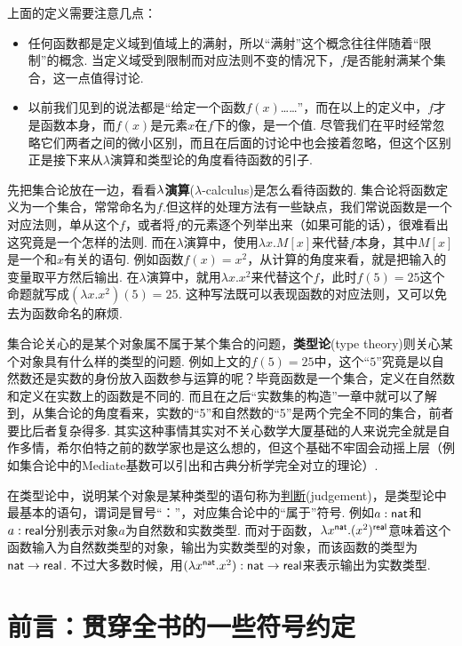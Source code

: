 \documentclass[main.tex]{subfiles}
\begin{document}
上面的定义需要注意几点：
\begin{itemize}
    \item [\(\bullet\)] 任何函数都是定义域到值域上的满射，所以“满射”这个概念往往伴随着“限制”的概念. 当定义域受到限制而对应法则不变的情况下，\(f\)是否能射满某个集合，这一点值得讨论.
    \item [\(\bullet\)] 以前我们见到的说法都是“给定一个函数\(f(x)\)……”，而在以上的定义中，\(f\)才是函数本身，而\(f(x)\)是元素\(x\)在\(f\)下的像，是一个值. 尽管我们在平时经常忽略它们两者之间的微小区别，而且在后面的讨论中也会接着忽略，但这个区别正是接下来从\(\lambda\)演算和类型论的角度看待函数的引子.
\end{itemize}

先把集合论放在一边，看看\({\rm \lambda}\)\textbf{演算}(\(\lambda\)-calculus)是怎么看待函数的. 集合论将函数定义为一个集合，常常命名为\(f\).但这样的处理方法有一些缺点，我们常说函数是一个对应法则，单从这个\(f\)，或者将\(f\)的元素逐个列举出来（如果可能的话），很难看出这究竟是一个怎样的法则. 而在\(\lambda\)演算中，使用\(\lambda x.M[x]\)来代替\(f\)本身，其中\(M[x]\)是一个和\(x\)有关的语句. 例如函数\(f(x)=x^2\)，从计算的角度来看，就是把输入的变量取平方然后输出. 在\(\lambda\)演算中，就用\(\lambda x.x^2\)来代替这个\(f\)，此时\(f(5)=25\)这个命题就写成\((\lambda x.x^2)(5)=25\). 这种写法既可以表现函数的对应法则，又可以免去为函数命名的麻烦.

集合论关心的是某个对象属不属于某个集合的问题，\textbf{类型论}(type theory)则关心某个对象具有什么样的类型的问题. 例如上文的\(f(5)=25\)中，这个“\(5\)”究竟是以自然数还是实数的身份放入函数参与运算的呢？毕竟函数是一个集合，定义在自然数和定义在实数上的函数是不同的. 而且在之后“实数集的构造”一章中就可以了解到，从集合论的角度看来，实数的“5”和自然数的“5”是两个完全不同的集合，前者要比后者复杂得多. 其实这种事情其实对不关心数学大厦基础的人来说完全就是自作多情，希尔伯特之前的数学家也是这么想的，但这个基础不牢固会动摇上层（例如集合论中的Mediate基数可以引出和古典分析学完全对立的理论）.

在类型论中，说明某个对象是某种类型的语句称为\uline{判断}(judgement)，是类型论中最基本的语句，谓词是冒号“：”，对应集合论中的“属于”符号. 例如\(a:{\sf nat}\)和\(a:{\sf real}\)分别表示对象\(a\)为自然数和实数类型. 而对于函数，\(\lambda x^{\sf nat}. (x^2)^{\sf real}\)意味着这个函数输入为自然数类型的对象，输出为实数类型的对象，而该函数的类型为\({\sf nat}\to{\sf real}\). 不过大多数时候，用\((\lambda x^{\sf nat}. x^2):{\sf nat} \to {\sf real}\)来表示输出为实数类型.

\section*{前言：贯穿全书的一些符号约定}
\end{document}
